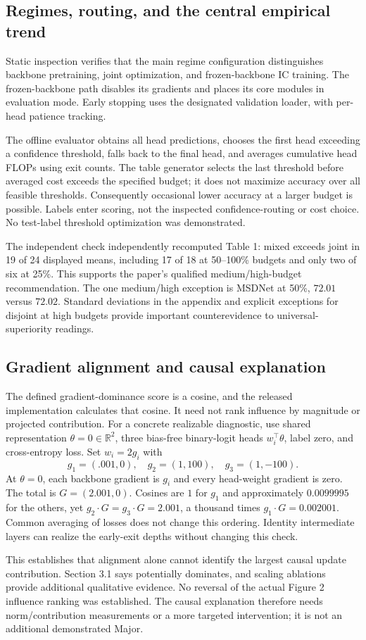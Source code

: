 \documentclass[10pt]{article}
\begin{document}
\subsection*{Regimes, routing, and the central empirical trend}
Static inspection verifies that the main regime configuration distinguishes backbone pretraining, joint optimization, and frozen-backbone IC training. The frozen-backbone path disables its gradients and places its core modules in evaluation mode. Early stopping uses the designated validation loader, with per-head patience tracking.\par
The offline evaluator obtains all head predictions, chooses the first head exceeding a confidence threshold, falls back to the final head, and averages cumulative head FLOPs using exit counts. The table generator selects the last threshold before averaged cost exceeds the specified budget; it does not maximize accuracy over all feasible thresholds. Consequently occasional lower accuracy at a larger budget is possible. Labels enter scoring, not the inspected confidence-routing or cost choice. No test-label threshold optimization was demonstrated.\par
The independent check independently recomputed Table 1: mixed exceeds joint in 19 of 24 displayed means, including 17 of 18 at 50–100\% budgets and only two of six at 25\%. This supports the paper’s qualified medium/high-budget recommendation. The one medium/high exception is MSDNet at 50\%, \(72.01\) versus \(72.02\). Standard deviations in the appendix and explicit exceptions for disjoint at high budgets provide important counterevidence to universal-superiority readings.\par
\subsection*{Gradient alignment and causal explanation}
The defined gradient-dominance score is a cosine, and the released implementation calculates that cosine. It need not rank influence by magnitude or projected contribution. For a concrete realizable diagnostic, use shared representation \(\theta=0\in\mathbb R^2\), three bias-free binary-logit heads \(w_i^\top\theta\), label zero, and cross-entropy loss. Set \(w_i=2g_i\) with \[g_1=(.001,0),\quad g_2=(1,100),\quad g_3=(1,-100).\] At \(\theta=0\), each backbone gradient is \(g_i\) and every head-weight gradient is zero. The total is \(G=(2.001,0)\). Cosines are \(1\) for \(g_1\) and approximately \(0.0099995\) for the others, yet \(g_2\cdot G=g_3\cdot G=2.001\), a thousand times \(g_1\cdot G=0.002001\). Common averaging of losses does not change this ordering. Identity intermediate layers can realize the early-exit depths without changing this check.\par
This establishes that alignment alone cannot identify the largest causal update contribution. Section 3.1 says potentially dominates, and scaling ablations provide additional qualitative evidence. No reversal of the actual Figure 2 influence ranking was established. The causal explanation therefore needs norm/contribution measurements or a more targeted intervention; it is not an additional demonstrated Major.\par
\end{document}
